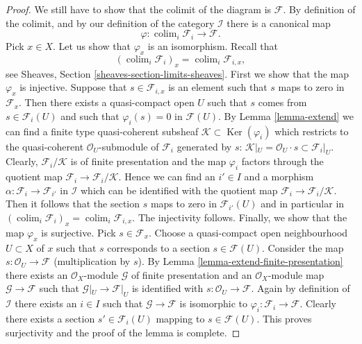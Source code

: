 \documentclass[10pt,a4paper]{amsart}
\theoremstyle{plain}
\theoremstyle{definition}
\theoremstyle{remark}
\numberwithin{equation}{subsection}
\def\colim{\mathop{\mathrm{colim}}\nolimits}
\def\Ker{\mathop{\mathrm{Ker}}}
\begin{document}
\begin{proof}
\medskip\noindent
We still have to show that the colimit of the diagram is $\mathcal{F}$.
By definition of the colimit, and by our definition of the category
$\mathcal{I}$ there is a canonical map
$$
\varphi :
\colim_i \mathcal{F}_i
\longrightarrow
\mathcal{F}.
$$
Pick $x \in X$. Let us show that $\varphi_x$ is an isomorphism.
Recall that
$$
(\colim_i \mathcal{F}_i)_x
=
\colim_i \mathcal{F}_{i, x},
$$
see
Sheaves, Section \ref{sheaves-section-limits-sheaves}.
First we show that the map $\varphi_x$ is injective.
Suppose that $s \in \mathcal{F}_{i, x}$ is an element
such that $s$ maps to zero in $\mathcal{F}_x$. Then there exists
a quasi-compact open $U$ such that $s$ comes from $s \in \mathcal{F}_i(U)$
and such that $\varphi_i(s) = 0$ in $\mathcal{F}(U)$.
By Lemma \ref{lemma-extend}
we can find a finite type quasi-coherent subsheaf
$\mathcal{K} \subset \Ker(\varphi_i)$ which restricts to
the quasi-coherent $\mathcal{O}_U$-submodule of $\mathcal{F}_i$
generated by $s$:
$\mathcal{K}|_U = \mathcal{O}_U\cdot s \subset \mathcal{F}_i|_U$.
Clearly, $\mathcal{F}_i/\mathcal{K}$ is of finite presentation and
the map $\varphi_i$ factors through the quotient map
$\mathcal{F}_i \to \mathcal{F}_i/\mathcal{K}$. Hence we can find
an $i' \in I$ and a morphism $\alpha : \mathcal{F}_i \to \mathcal{F}_{i'}$
in $\mathcal{I}$ which can be identified with the quotient map
$\mathcal{F}_i \to \mathcal{F}_i/\mathcal{K}$. Then it follows
that the section $s$ maps to zero in $\mathcal{F}_{i'}(U)$ and
in particular in
$(\colim_i \mathcal{F}_i)_x =
\colim_i \mathcal{F}_{i, x}$.
The injectivity follows.
Finally, we show that the map $\varphi_x$ is surjective.
Pick $s \in \mathcal{F}_x$. Choose a quasi-compact open neighbourhood
$U \subset X$ of $x$ such that $s$ corresponds to a section
$s \in \mathcal{F}(U)$. Consider the map
$s : \mathcal{O}_U \to \mathcal{F}$ (multiplication by $s$).
By Lemma \ref{lemma-extend-finite-presentation}
there exists an $\mathcal{O}_X$-module $\mathcal{G}$
of finite presentation and an $\mathcal{O}_X$-module map
$\mathcal{G} \to \mathcal{F}$ such that $\mathcal{G}|_U \to \mathcal{F}|_U$
is identified with
$s : \mathcal{O}_U \to \mathcal{F}$.
Again by definition of $\mathcal{I}$ there exists an $i \in I$
such that $\mathcal{G} \to \mathcal{F}$ is isomorphic to
$\varphi_i : \mathcal{F}_i \to \mathcal{F}$. Clearly there exists
a section $s' \in \mathcal{F}_i(U)$ mapping to $s \in \mathcal{F}(U)$.
This proves surjectivity and the proof of the lemma is complete.
\end{proof}
\end{document}

